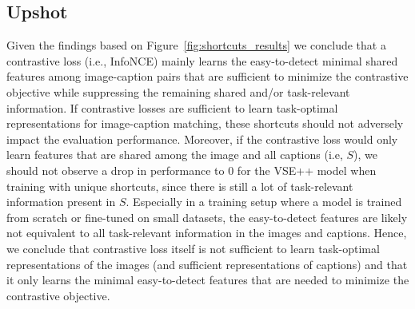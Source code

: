 \subsection{Upshot}
Given the findings based on Figure~\ref{fig:shortcuts_results} we conclude that a contrastive loss (i.e., InfoNCE) mainly learns the easy-to-detect minimal shared features among image-caption pairs that are sufficient to minimize the contrastive objective while suppressing the remaining shared and/or task-relevant information.  
If contrastive losses are sufficient to learn task-optimal representations for image-caption matching, these shortcuts should not adversely impact the evaluation performance.
Moreover, if the contrastive loss would only learn features that are shared among the image and all captions (i.e, $S$), we should not observe a drop in performance to 0 for the VSE++ model when training with unique shortcuts, since there is still a lot of task-relevant information present in $S$.
Especially in a training setup where a model is trained from scratch or fine-tuned on small datasets, the easy-to-detect features are likely not equivalent to all task-relevant information in the images and captions.
Hence, we conclude that contrastive loss itself is not sufficient to learn task-optimal representations of the images (and sufficient representations of captions) and that it only learns the minimal easy-to-detect features that are needed to minimize the contrastive objective.
